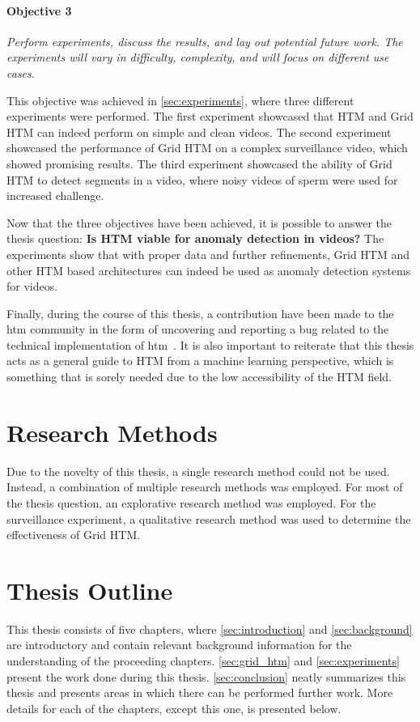 \paragraph*{Objective 3} \emph{Perform experiments, discuss the results, and lay out potential future work. The experiments will vary in difficulty, complexity, and will focus on different use cases.}
\par
This objective was achieved in \autoref{sec:experiments}, where three different experiments were performed. The first experiment showcased that HTM and Grid HTM can indeed perform on simple and clean videos. The second experiment showcased the performance of Grid HTM on a complex surveillance video, which showed promising results. The third experiment showcased the ability of Grid HTM to detect segments in a video, where noisy videos of sperm were used for increased challenge.
\par
Now that the three objectives have been achieved, it is possible to answer the thesis question: \textbf{Is HTM viable for anomaly detection in videos?} The experiments show that with proper data and further refinements, Grid HTM and other HTM based architectures can indeed be used as anomaly detection systems for videos.
\par
Finally, during the course of this thesis, a contribution have been made to the  \gls*{htm} community in the form of uncovering and reporting a bug related to the technical implementation of  \gls*{htm}~\cite{github_contrib}. It is also important to reiterate that this thesis acts as a general guide to HTM from a machine learning perspective, which is something that is sorely needed due to the low accessibility of the HTM field.
\section{Research Methods}
Due to the novelty of this thesis, a single research method could not be used. Instead, a combination of multiple research methods was employed. For most of the thesis question, an explorative research method was employed. For the surveillance experiment, a qualitative research method was used to determine the effectiveness of Grid HTM.
\section{Thesis Outline}
This thesis consists of five chapters, where \autoref{sec:introduction} and \autoref{sec:background} are introductory and contain relevant background information for the understanding of the proceeding chapters. \autoref{sec:grid_htm} and \autoref{sec:experiments} present the work done during this thesis. \autoref{sec:conclusion} neatly summarizes this thesis and presents areas in which there can be performed further work. More details for each of the chapters, except this one, is presented below.
\par
